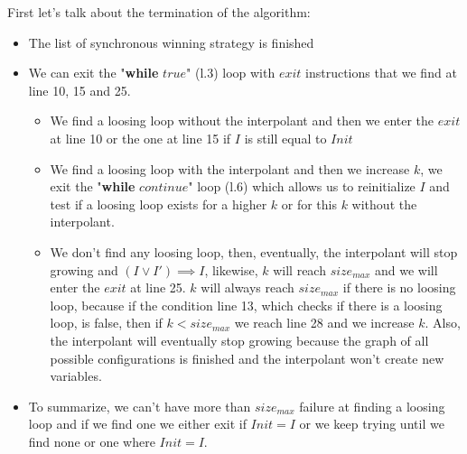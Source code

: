 \documentclass{article}
\begin{document}
\noindent First let's talk about the termination of the algorithm:
\begin{itemize}
    \item The list of synchronous winning strategy is finished
    \item We can exit the "\textbf{while} $true$"  (l.3) loop with $exit$ instructions that we find at line 10, 15 and 25.
    \begin{itemize}
        \item We find a loosing loop without the interpolant and then we enter the $exit$ at line 10 or the one at line 15 if $I$ is still equal to $Init$
        \item We find a loosing loop with the interpolant and then we increase $k$, we exit the "\textbf{while} $continue$" loop  (l.6) which allows us to reinitialize $I$ and test if a loosing loop exists for a higher $k$ or for this $k$ without the interpolant.
        \item We don't find any loosing loop, then, eventually, the interpolant will stop growing and $ (I \lor I') \implies I$, likewise, $k$ will reach $size_{max}$ and we will enter the $exit$ at line 25. $k$ will always reach $size_{max}$ if there is no loosing loop, because if the condition line 13, which checks if there is a loosing loop, is false, then if $k < size_{max}$ we reach line 28 and we increase $k$. Also, the interpolant will eventually stop growing because the graph of all possible configurations is finished and the interpolant won't create new variables.
    \end{itemize}
    \item To summarize, we can't have more than $size_{max}$ failure at finding a loosing loop and if we find one we either exit if $Init = I$ or we keep trying until we find none or one where $Init = I$.
\end{itemize}
\end{document}
